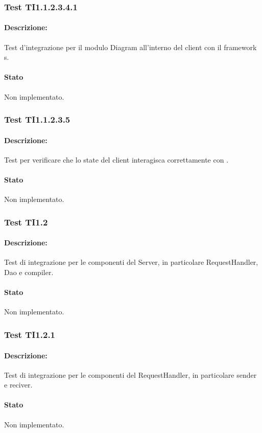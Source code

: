 \documentclass[../PianoDiQualifica.tex]{subfiles}
\begin{document}
	\subsubsection{Test TI1.1.2.3.4.1}
	\paragraph{Descrizione:} Test d'integrazione per il modulo Diagram all'interno del client con il framework s. 
	\paragraph{Stato} Non implementato.
	\subsubsection{Test TI1.1.2.3.5}
	\paragraph{Descrizione:} Test per verificare che lo state del client interagisca correttamente con . 
	\paragraph{Stato} Non implementato.
	
	\subsubsection{Test TI1.2}
	\paragraph{Descrizione:} Test di integrazione per le componenti del Server, in particolare RequestHandler, Dao e compiler.
	\paragraph{Stato} Non implementato.
	
	\subsubsection{Test TI1.2.1}
	\paragraph{Descrizione:} Test di integrazione per le componenti del RequestHandler, in particolare sender e reciver.
	\paragraph{Stato} Non implementato.
\end{document}
